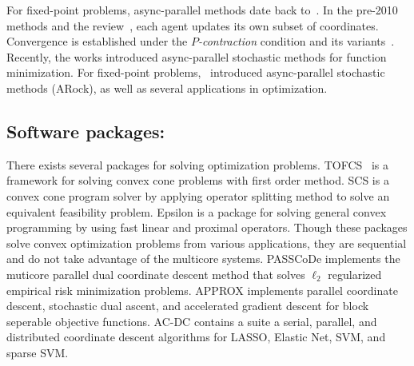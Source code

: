 For fixed-point problems, async-parallel methods date back to~\citep{baudet1978asynchronous}. In  the pre-2010 methods \citep{BMR1997asyn-multisplit,bertsekas1983distributed,Baz200591,el1998flexible} and the review~\citep{frommer2000asynchronous}, each agent updates its own subset of coordinates. Convergence is established under the \emph{$P$-contraction} condition and its variants~\citep{bertsekas1983distributed}. Recently, the works \citep{nedic2001distributed,recht2011hogwild,liu2013asynchronous,liu2014asynchronous,hsieh2015passcode} introduced async-parallel stochastic methods for function minimization.
For fixed-point problems,~\citep{PengXuYanYin2015_arock} introduced async-parallel stochastic methods (ARock), as well as several applications in optimization.



\subsection*{Software packages:}
There exists several packages for solving optimization problems. 
TOFCS~\citep{becker2011templates} is a framework for solving convex cone problems with first order method. 
SCS \citep{ocpb:16} is a convex cone program solver by applying operator splitting method to solve an equivalent
 feasibility problem. 
Epsilon \citep{wytock2015convex} is a package for solving general convex programming by using fast linear and proximal operators.
Though these packages solve convex optimization problems from various applications, they are sequential and do not take advantage of
the multicore systems.  
PASSCoDe \citep{hsieh2015passcode} implements the muticore parallel dual coordinate descent method that solves $\ell_2$ regularized 
empirical risk minimization problems.
APPROX\citep{fercoq2015accelerated} implements  parallel coordinate descent, stochastic dual ascent, and accelerated gradient descent for block seperable objective functions.
AC-DC\citep{richtarik2016parallel} contains a suite a serial, parallel, and distributed coordinate descent algorithms for LASSO, Elastic Net, SVM, and sparse SVM.

